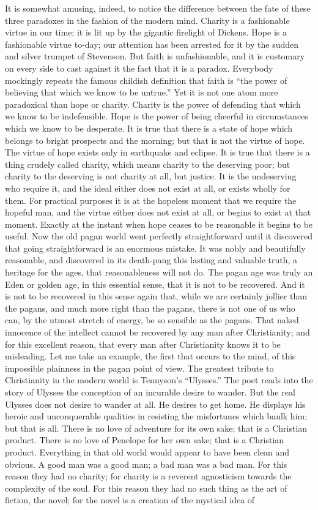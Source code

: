 It is somewhat amusing, indeed, to notice the difference between the fate of these three paradoxes in the fashion of the modern mind. Charity is a fashionable virtue in our time; it is lit up by the gigantic firelight of Dickens. Hope is a fashionable virtue to-day; our attention has been arrested for it by the sudden and silver trumpet of Stevenson. But faith is unfashionable, and it is customary on every side to cast against it the fact that it is a paradox. Everybody mockingly repeats the famous childish definition that faith is “the power of believing that which we know to be untrue.” Yet it is not one atom more paradoxical than hope or charity. Charity is the power of defending that which we know to be indefensible. Hope is the power of being cheerful in circumstances which we know to be desperate. It is true that there is a state of hope which belongs to bright prospects and the morning; but that is not the virtue of hope. The virtue of hope exists only in earthquake and eclipse. It is true that there is a thing crudely called charity, which means charity to the deserving poor; but charity to the deserving is not charity at all, but justice. It is the undeserving who require it, and the ideal either does not exist at all, or exists wholly for them. For practical purposes it is at the hopeless moment that we require the hopeful man, and the virtue either does not exist at all, or begins to exist at that moment. Exactly at the instant when hope ceases to be reasonable it begins to be useful. Now the old pagan world went perfectly straightforward until it discovered that going straightforward is an enormous mistake. It was nobly and beautifully reasonable, and discovered in its death-pang this lasting and valuable truth, a heritage for the ages, that reasonableness will not do. The pagan age was truly an Eden or golden age, in this essential sense, that it is not to be recovered. And it is not to be recovered in this sense again that, while we are certainly jollier than the pagans, and much more right than the pagans, there is not one of us who can, by the utmost stretch of energy, be so sensible as the pagans. That naked innocence of the intellect cannot be recovered by any man after Christianity; and for this excellent reason, that every man after Christianity knows it to be misleading. Let me take an example, the first that occurs to the mind, of this impossible plainness in the pagan point of view. The greatest tribute to Christianity in the modern world is Tennyson’s “Ulysses.” The poet reads into the story of Ulysses the conception of an incurable desire to wander. But the real Ulysses does not desire to wander at all. He desires to get home. He displays his heroic and unconquerable qualities in resisting the misfortunes which baulk him; but that is all. There is no love of adventure for its own sake; that is a Christian product. There is no love of Penelope for her own sake; that is a Christian product. Everything in that old world would appear to have been clean and obvious. A good man was a good man; a bad man was a bad man. For this reason they had no charity; for charity is a reverent agnosticism towards the complexity of the soul. For this reason they had no such thing as the art of fiction, the novel; for the novel is a creation of the mystical idea of 